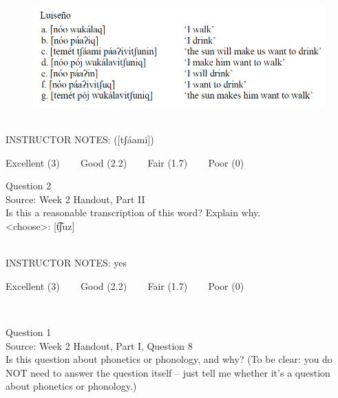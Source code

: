 \documentclass[12pt]{article}
\begin{document}
\begin{figure}[H]
\includegraphics{../images/luiseno.png}
\end{figure}

~\\
INSTRUCTOR NOTES: ([tʃáami])


\vfill
Excellent (3) ~~~ Good (2.2) ~~~ Fair (1.7) ~~~ Poor (0)
\newpage

{\large Question 2}\\

Source: Week 2 Handout, Part II\\

Is this a reasonable transcription of this word? Explain why.\\

<choose>: {[t͡ʃuz]}


~\\
INSTRUCTOR NOTES: yes


\vfill
Excellent (3) ~~~ Good (2.2) ~~~ Fair (1.7) ~~~ Poor (0)
\newpage

\begin{center}
\textbf{{\color{red}{\HUGE END OF EXAM}}}\\

\end{center}
\newpage

\begin{center}
\textbf{{\color{blue}{\HUGE START OF EXAM\\}}}

\textbf{{\color{blue}{\HUGE Student ID: 12991\\}}}

\textbf{{\color{blue}{\HUGE 9:50\\}}}

\end{center}
\newpage

{\large Question 1}\\

Source: Week 2 Handout, Part I, Question 8\\

Is this question about phonetics or phonology, and why? (To be clear: you do NOT need to answer the question itself -- just tell me whether it's a question about phonetics or phonology.)\\
\end{document}
